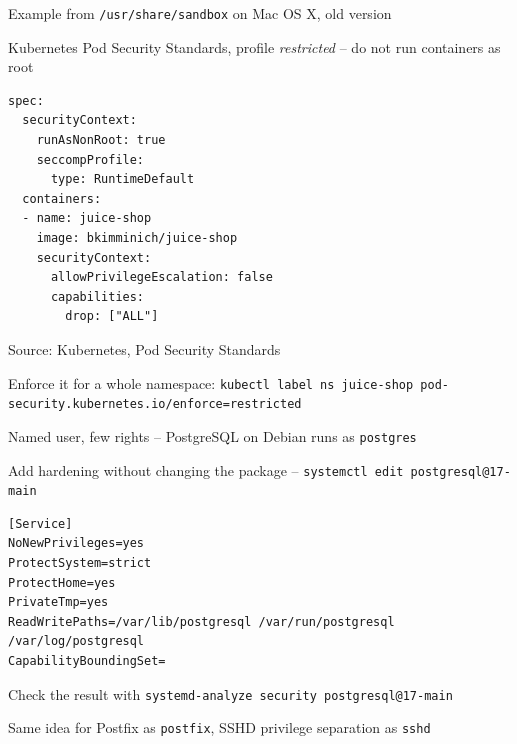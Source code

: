 \documentclass[Screen16to9,17pt]{foils}
\begin{document}
\begin{list1}
\item Example from \verb+/usr/share/sandbox+ on Mac OS X, old version
\end{list1}




\begin{list1}
\item Kubernetes Pod Security Standards, profile \emph{restricted} -- do not run containers as root
\end{list1}

\begin{verbatim}
spec:
  securityContext:
    runAsNonRoot: true
    seccompProfile:
      type: RuntimeDefault
  containers:
  - name: juice-shop
    image: bkimminich/juice-shop
    securityContext:
      allowPrivilegeEscalation: false
      capabilities:
        drop: ["ALL"]
\end{verbatim}

Source: Kubernetes, Pod Security Standards
{\footnotesize{}}

{\footnotesize Enforce it for a whole namespace: \verb+kubectl label ns juice-shop pod-security.kubernetes.io/enforce=restricted+}



\begin{list1}
\item Named user, few rights -- PostgreSQL on Debian runs as \verb+postgres+
\item Add hardening without changing the package -- \verb+systemctl edit postgresql@17-main+
\end{list1}

\begin{verbatim}
[Service]
NoNewPrivileges=yes
ProtectSystem=strict
ProtectHome=yes
PrivateTmp=yes
ReadWritePaths=/var/lib/postgresql /var/run/postgresql /var/log/postgresql
CapabilityBoundingSet=
\end{verbatim}

\begin{list1}
\item Check the result with \verb+systemd-analyze security postgresql@17-main+
\item Same idea for Postfix as \verb+postfix+, SSHD privilege separation as \verb+sshd+
\end{list1}
\end{document}
